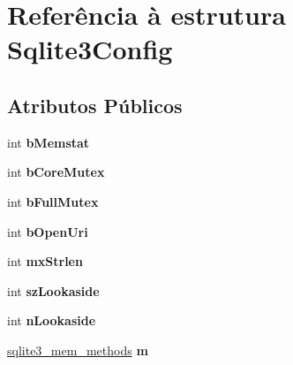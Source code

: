 \hypertarget{struct_sqlite3_config}{\section{Referência à estrutura Sqlite3\-Config}
\label{struct_sqlite3_config}
}
\subsection*{Atributos Públicos}
\begin{DoxyCompactItemize}
\item 
\hypertarget{struct_sqlite3_config_aae01de5f37a66422f2a7413e108e03fe}{int {\bfseries b\-Memstat}}\label{struct_sqlite3_config_aae01de5f37a66422f2a7413e108e03fe}

\item 
\hypertarget{struct_sqlite3_config_a202216a82e0823d0a4629c4884215a54}{int {\bfseries b\-Core\-Mutex}}\label{struct_sqlite3_config_a202216a82e0823d0a4629c4884215a54}

\item 
\hypertarget{struct_sqlite3_config_aab880bf54370cd0f6210afce0fb646ee}{int {\bfseries b\-Full\-Mutex}}\label{struct_sqlite3_config_aab880bf54370cd0f6210afce0fb646ee}

\item 
\hypertarget{struct_sqlite3_config_af446c9f0657e5564b4dbba3421ffc8be}{int {\bfseries b\-Open\-Uri}}\label{struct_sqlite3_config_af446c9f0657e5564b4dbba3421ffc8be}

\item 
\hypertarget{struct_sqlite3_config_a66f1f85ec9b7724f7fe0bebad61a634f}{int {\bfseries mx\-Strlen}}\label{struct_sqlite3_config_a66f1f85ec9b7724f7fe0bebad61a634f}

\item 
\hypertarget{struct_sqlite3_config_ad7504c4c1867db9837b40d7c22ba7582}{int {\bfseries sz\-Lookaside}}\label{struct_sqlite3_config_ad7504c4c1867db9837b40d7c22ba7582}

\item 
\hypertarget{struct_sqlite3_config_a2519388eb9688eb3dbdc9b279ee73e0a}{int {\bfseries n\-Lookaside}}\label{struct_sqlite3_config_a2519388eb9688eb3dbdc9b279ee73e0a}

\item 
\hypertarget{struct_sqlite3_config_a922ec99508e346db8e4fbaec58aa1ff9}{\hyperlink{structsqlite3__mem__methods}{sqlite3\-\_\-mem\-\_\-methods} {\bfseries m}}\label{struct_sqlite3_config_a922ec99508e346db8e4fbaec58aa1ff9}


\end{DoxyCompactItemize}
